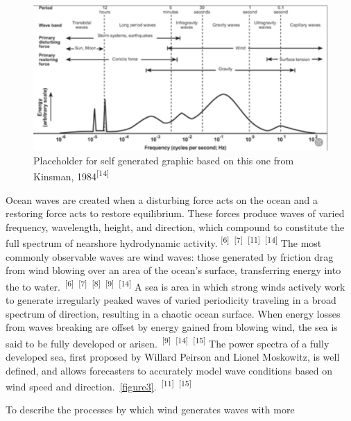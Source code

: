 \documentclass{article}
\begin{document}
\begin{figure} 
    \centering
    \includegraphics[width=1\linewidth]{images/ocean-wave-energy-schematic.png}
    \caption{Placeholder for self generated graphic based on this one from Kinsman, 1984\textsuperscript{[14]}}
    \label{figure2}
\end{figure}

{\hspace{.5cm}Ocean waves are created when a disturbing force acts on the ocean and a restoring force acts to restore equilibrium. These forces produce waves of varied frequency, wavelength, height, and direction, which compound to constitute the full spectrum of nearshore hydrodynamic activity. \textsuperscript{[6]}~\textsuperscript{[7]}~\textsuperscript{[11]}~\textsuperscript{[14]} The most commonly observable waves are wind waves: those generated by friction drag from wind blowing over an area of the ocean's surface, transferring energy into the to water.~\textsuperscript{[6]}~\textsuperscript{[7]}~\textsuperscript{[8]}~\textsuperscript{[9]}~\textsuperscript{[14]} A sea is area in which strong winds actively work to generate irregularly peaked waves of varied periodicity traveling in a broad spectrum of direction, resulting in a chaotic ocean surface. When energy losses from waves breaking are offset by energy gained from blowing wind, the sea is said to be fully developed or arisen.~\textsuperscript{[9]}~\textsuperscript{[14]}~\textsuperscript{[15]} The power spectra of a fully developed sea, first proposed by Willard Peirson and Lionel Moskowitz, is well defined, and allows forecasters to accurately model wave conditions based on wind speed and direction.~\cref{figure3}.~\textsuperscript{[11]}~\textsuperscript{[15]}\par}

{To describe the processes by which wind generates waves with more \par}
\end{document}

